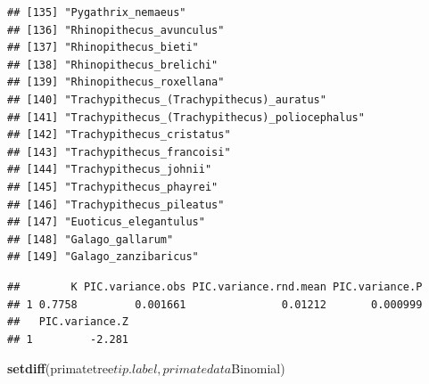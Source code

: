 \documentclass[]{article}
\newenvironment{Shaded}{\begin{snugshade}}{\end{snugshade}}
\newcommand{\KeywordTok}[1]{\textcolor[rgb]{0.13,0.29,0.53}{\textbf{{#1}}}}
\newcommand{\NormalTok}[1]{{#1}}
\begin{document}
\begin{verbatim}
## [135] "Pygathrix_nemaeus"                            
## [136] "Rhinopithecus_avunculus"                      
## [137] "Rhinopithecus_bieti"                          
## [138] "Rhinopithecus_brelichi"                       
## [139] "Rhinopithecus_roxellana"                      
## [140] "Trachypithecus_(Trachypithecus)_auratus"      
## [141] "Trachypithecus_(Trachypithecus)_poliocephalus"
## [142] "Trachypithecus_cristatus"                     
## [143] "Trachypithecus_francoisi"                     
## [144] "Trachypithecus_johnii"                        
## [145] "Trachypithecus_phayrei"                       
## [146] "Trachypithecus_pileatus"                      
## [147] "Euoticus_elegantulus"                         
## [148] "Galago_gallarum"                              
## [149] "Galago_zanzibaricus"
\end{verbatim}

\begin{verbatim}
##        K PIC.variance.obs PIC.variance.rnd.mean PIC.variance.P
## 1 0.7758         0.001661               0.01212       0.000999
##   PIC.variance.Z
## 1         -2.281
\end{verbatim}

\begin{Shaded}
\begin{Highlighting}[]
\KeywordTok{setdiff}\NormalTok{(primatetree$tip.label, primatedata$Binomial)}
\end{Highlighting}
\end{Shaded}
\end{document}
